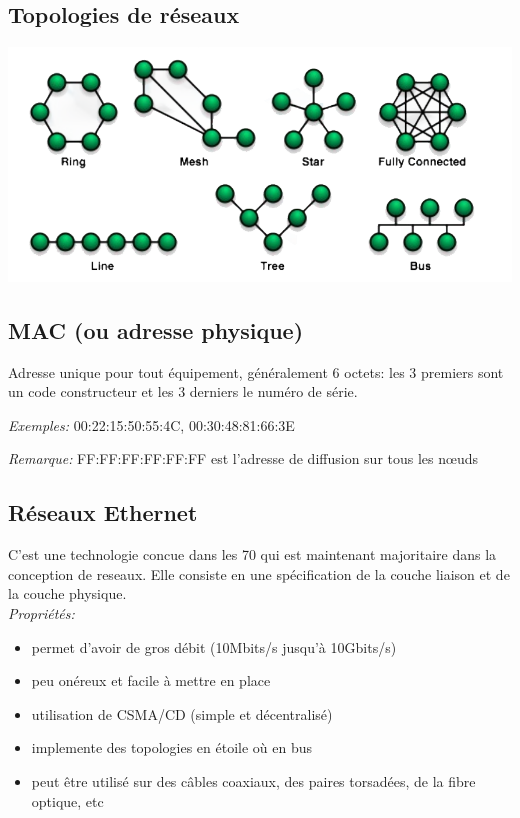 \documentclass[a4paper, 12pt, french]{article}
\begin{document}
	\subsection{Topologies de réseaux}

	\includegraphics[width=13.8cm]{reseau_topologies}

	\subsection{MAC (ou adresse physique)}

	Adresse unique pour tout équipement, généralement 6 octets: les 3 premiers sont un code constructeur et les 3 derniers le numéro de série.

	\emph{Exemples:} 00:22:15:50:55:4C, 00:30:48:81:66:3E

	\emph{Remarque:} FF:FF:FF:FF:FF:FF est l'adresse de diffusion sur tous les nœuds

	\subsection{Réseaux Ethernet}

	C'est une technologie concue dans les 70 qui est maintenant majoritaire dans la conception de reseaux. Elle consiste en une spécification de la couche liaison et de la couche physique.\\

	\emph{Propriétés:}
	\begin{itemize}
		\item permet d'avoir de gros débit (10Mbits/s jusqu'à 10Gbits/s)
		\item peu onéreux et facile à mettre en place
		\item utilisation de CSMA/CD (simple et décentralisé)
		\item implemente des topologies en étoile où en bus
		\item peut être utilisé sur des câbles coaxiaux, des paires torsadées, de la fibre optique, etc
	\end{itemize}
\end{document}
